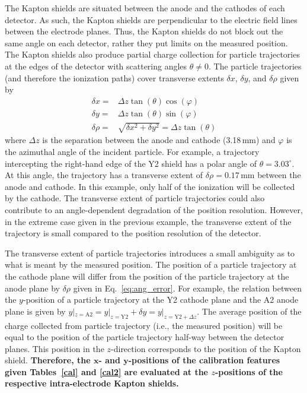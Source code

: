 The Kapton shields are situated between the anode and the cathodes of each detector.  As such, the Kapton shields are perpendicular to the electric field lines between the electrode planes.  Thus, the Kapton shields do not block out the same angle on each detector, rather they put limits on the measured position.  The Kapton shields also produce partial charge collection for particle trajectories at the edges of the detector with scattering angles $\theta \neq 0$.  The particle trajectories (and therefore the ionization paths) cover transverse extents $\delta x$, $\delta y$, and $\delta \rho$ given by %
\begin{equation}
  \begin{split}
\delta x=&\Delta z\tan(\theta)\cos(\varphi)\\
\delta y=&\Delta z\tan(\theta)\sin(\varphi)\\
\delta \rho=&\sqrt{\delta x^2 + \delta y^2}
=\Delta z\tan(\theta)
\label{eq:ang_error}
\end{split}
\end{equation}
where $\Delta z$ is the separation between the anode and cathode (3.18\,mm) and $\varphi$ is the azimuthal angle of the incident particle.  For example, a trajectory intercepting the right-hand edge of the Y2 shield has a polar angle of $\theta=3.03^\circ$.  At this angle, the trajectory has a transverse extent of $\delta \rho = 0.17$\,mm between the anode and cathode. %
In this example, only half of the ionization %
will be collected by the cathode. %
The transverse extent of particle trajectories could also contribute to %
 an angle-dependent degradation of the position resolution.  However, in the extreme case given in the previous example, the transverse extent of the trajectory is small compared to the position resolution of the detector.

The transverse extent of particle trajectories introduces a small ambiguity as to what is meant by the measured position.  The position of a particle trajectory at the cathode plane will differ from the position of the particle trajectory at the anode plane by $\delta \rho$ given in Eq.~\ref{eq:ang_error}.  For example, the relation between the $y$-position of a particle trajectory at the Y2 cathode plane and the A2 anode plane is given by 
$y|_{z=\textrm{A2}}=y|_{z=\textrm{Y2}}+\delta y=y|_{z=\textrm{Y2}+\Delta z}$. %
The average position of the charge collected from particle trajectory (i.e., the measured position) will be equal to the position of the particle trajectory half-way between the detector planes.  This position in the $z$-direction corresponds to the position of the Kapton shield.  \textbf{Therefore, the $\boldsymbol{x}$- and $\boldsymbol{y}$-positions of the calibration features given Tables~\ref{cal} and \ref{cal2} are evaluated at the $z$-positions of the respective intra-electrode Kapton shields.}


